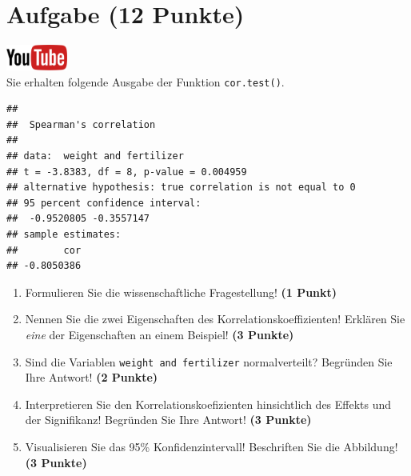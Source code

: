 \documentclass[a4paper, 9pt]{scrartcl}\usepackage[]{graphicx}\usepackage[]{xcolor}
\makeatletter
\newenvironment{kframe}{%
 \def\at@end@of@kframe{}%
 \ifinner\ifhmode%
  \def\at@end@of@kframe{\end{minipage}}%
  \begin{minipage}{\columnwidth}%
 \fi\fi%
 \def\FrameCommand##1{\hskip\@totalleftmargin \hskip-\fboxsep
 \colorbox{shadecolor}{##1}\hskip-\fboxsep
     \hskip-\linewidth \hskip-\@totalleftmargin \hskip\columnwidth}%
 \MakeFramed {\advance\hsize-\width
   \@totalleftmargin\z@ \linewidth\hsize
   \@setminipage}}%
 {\par\unskip\endMakeFramed%
 \at@end@of@kframe}
\newenvironment{knitrout}{}{} %
\makeatother
\begin{document}
 
\clearpage

\section{Aufgabe \hfill (12 Punkte)}

\hfill\href{https://youtu.be/C9skfFRTHhI}{\includegraphics[width =
   2cm]{img/youtube}}\\[1Ex]

Sie erhalten folgende \Rlogo Ausgabe der Funktion \texttt{cor.test()}.

\begin{knitrout}
\color{fgcolor}\begin{kframe}
\begin{verbatim}
## 
## 	Spearman's correlation
## 
## data:  weight and fertilizer
## t = -3.8383, df = 8, p-value = 0.004959
## alternative hypothesis: true correlation is not equal to 0
## 95 percent confidence interval:
##  -0.9520805 -0.3557147
## sample estimates:
##        cor 
## -0.8050386
\end{verbatim}
\end{kframe}
\end{knitrout}


\begin{enumerate}
  \item Formulieren Sie die wissenschaftliche Fragestellung! \textbf{(1
Punkt)}
\item Nennen Sie die zwei Eigenschaften des Korrelationskoeffizienten!
  Erkl{\"a}ren Sie \textit{eine} der Eigenschaften an einem Beispiel! \textbf{(3
    Punkte)}
\item Sind die Variablen \texttt{weight and fertilizer} normalverteilt?
  Begr{\"u}nden Sie Ihre Antwort! \textbf{(2 Punkte)}
\item Interpretieren Sie den Korrelationskoefizienten hinsichtlich des
  Effekts und der Signifikanz! Begr{\"u}nden Sie
  Ihre Antwort! \textbf{(3 Punkte)}
\item Visualisieren Sie das 95\% Konfidenzintervall! Beschriften Sie die Abbildung! \textbf{(3 Punkte)} 
\end{enumerate} 
\clearpage
\end{document}
